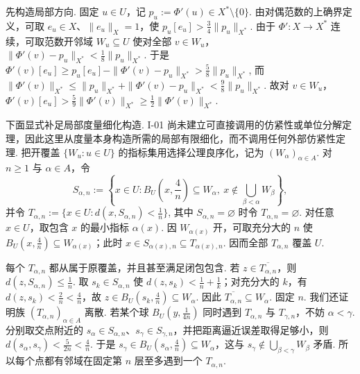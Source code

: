 \begin{FAProof}
先构造局部方向. 固定 \(\displaystyle u\in U\)，记 \(\displaystyle p_u:=\Phi'(u)\in X^*\setminus\{0\}\). 由对偶范数的上确界定义，可取 \(\displaystyle e_u\in X\)、\(\displaystyle\|e_u\|_X=1\)，使
\(\displaystyle p_u[e_u] > \frac{3}{4}\|p_u\|_{X^*}\).
由于 \(\displaystyle\Phi':X\to X^*\) 连续，可取范数开邻域 \(\displaystyle W_u\subseteq U\) 使对全部 \(\displaystyle v\in W_u\)，
\(\displaystyle \|\Phi'(v)-p_u\|_{X^*} < \frac{1}{8}\|p_u\|_{X^*}\).
于是
\(\displaystyle \Phi'(v)[e_u] \geqslant p_u[e_u]-\|\Phi'(v)-p_u\|_{X^*} > \frac{5}{8}\|p_u\|_{X^*}\),
而
\(\displaystyle \|\Phi'(v)\|_{X^*} \leqslant \|p_u\|_{X^*}+\|\Phi'(v)-p_u\|_{X^*} < \frac{9}{8}\|p_u\|_{X^*}\).
故对 \(\displaystyle v\in W_u\)，
\(\displaystyle \Phi'(v)[e_u] > \frac{5}{9}\|\Phi'(v)\|_{X^*} \geqslant \frac{1}{2}\|\Phi'(v)\|_{X^*}\).

下面显式补足局部度量细化构造. I-01 尚未建立可直接调用的仿紧性或单位分解定理，因此这里从度量本身构造所需的局部有限细化，而不调用任何外部仿紧性定理. 把开覆盖 \(\displaystyle\{W_u:u\in U\}\) 的指标集用选择公理良序化，记为 \(\displaystyle(W_\alpha)_{\alpha\in A}\). 对 \(\displaystyle n\geqslant1\) 与 \(\displaystyle\alpha\in A\)，令
\[
S_{\alpha,n}
:=
\left\{
 x\in U:
 B_U\!\left(x,\frac{4}{n}\right)\subseteq W_\alpha,
 \ x\notin\bigcup_{\beta<\alpha}W_\beta
\right\},
\]
并令
\(\displaystyle T_{\alpha,n} := \{x\in U:d(x,S_{\alpha,n})<\frac{1}{n}\}\),
其中 \(\displaystyle S_{\alpha,n}=\varnothing\) 时令 \(\displaystyle T_{\alpha,n}=\varnothing\). 对任意 \(\displaystyle x\in U\)，取包含 \(\displaystyle x\) 的最小指标 \(\displaystyle\alpha(x)\). 因 \(\displaystyle W_{\alpha(x)}\) 开，可取充分大的 \(\displaystyle n\) 使 \(\displaystyle B_U\!\left(x,\frac{4}{n}\right)\subseteq W_{\alpha(x)}\)；此时 \(\displaystyle x\in S_{\alpha(x),n}\subseteq T_{\alpha(x),n}\). 因而全部 \(\displaystyle T_{\alpha,n}\) 覆盖 \(\displaystyle U\).

每个 \(\displaystyle T_{\alpha,n}\) 都从属于原覆盖，并且甚至满足闭包包含. 若 \(\displaystyle z\in\overline{T_{\alpha,n}}\)，则 \(\displaystyle d(z,S_{\alpha,n})\leqslant\frac{1}{n}\). 取 \(\displaystyle s_k\in S_{\alpha,n}\) 使 \(\displaystyle d(z,s_k)<\frac{1}{n}+\frac{1}{k}\)；对充分大的 \(\displaystyle k\)，有 \(\displaystyle d(z,s_k)<\frac{2}{n}<\frac{4}{n}\)，故 \(\displaystyle z\in B_U\!\left(s_k,\frac{4}{n}\right)\subseteq W_\alpha\). 因此
\(\displaystyle \overline{T_{\alpha,n}} \subseteq W_\alpha\).
固定 \(\displaystyle n\). 我们还证明族 \(\displaystyle(T_{\alpha,n})_{\alpha\in A}\) 离散. 若某个球 \(\displaystyle B_U\!\left(y,\frac{1}{4n}\right)\) 同时遇到 \(\displaystyle T_{\alpha,n}\) 与 \(\displaystyle T_{\gamma,n}\)，不妨 \(\displaystyle\alpha<\gamma\). 分别取交点附近的 \(\displaystyle s_\alpha\in S_{\alpha,n}\)、\(\displaystyle s_\gamma\in S_{\gamma,n}\)，并把距离逼近误差取得足够小，则
\(\displaystyle d(s_\alpha,s_\gamma) < \frac{5}{2n} < \frac{4}{n}\).
于是 \(\displaystyle s_\gamma\in B_U(s_\alpha,\frac{4}{n})\subseteq W_\alpha\)，这与 \(\displaystyle s_\gamma\notin\bigcup_{\beta<\gamma}W_\beta\) 矛盾. 所以每个点都有邻域在固定第 \(\displaystyle n\) 层至多遇到一个 \(\displaystyle T_{\alpha,n}\).


\end{FAProof}
